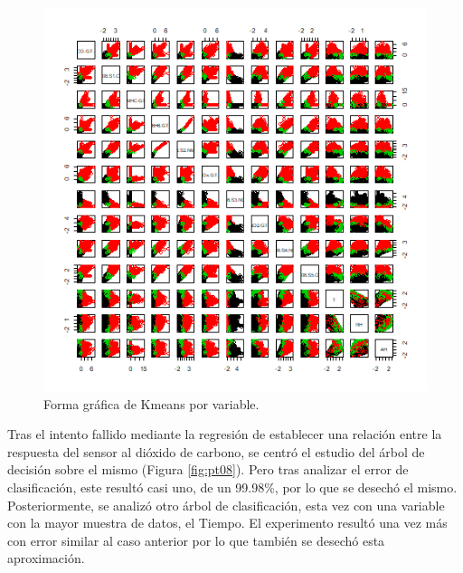 \documentclass[a4paper,10pt,twocolumn]{article}
\begin{document}
  \begin{figure}[htb]%
  	\begin{center}
  		\includegraphics[width=\linewidth]{Images/kmeans1.png}
  	\end{center}
  	\caption{Forma gráfica de Kmeans por variable.}
  	\label{fig:kmeans2}
  \end{figure}

  Tras el intento fallido mediante la regresión de establecer una relación entre la respuesta del sensor al dióxido de carbono, se centró el estudio del árbol de decisión sobre el mismo (Figura \ref{fig:pt08}). Pero tras
  analizar el error de clasificación, este resultó casi uno, de un 99.98\%, por lo que se desechó el mismo. Posteriormente, se analizó otro árbol de clasificación, esta vez con una variable con la mayor muestra de datos, el Tiempo. El experimento resultó una vez más con error similar al caso anterior por lo que también se desechó esta aproximación.
  
\end{document}
